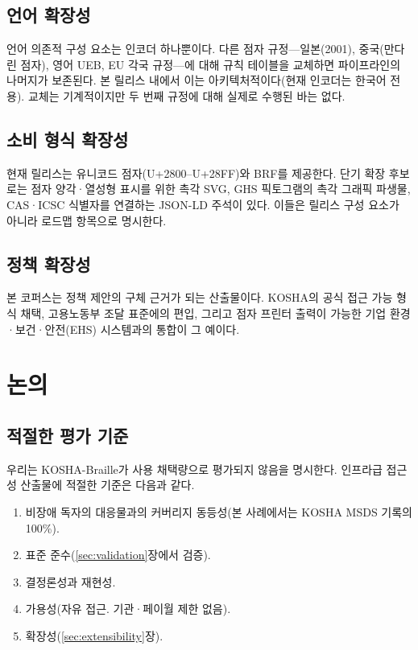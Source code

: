 \documentclass[journal]{IEEEtran}
\begin{document}
\subsection{언어 확장성}

언어 의존적 구성 요소는 인코더 하나뿐이다. 다른 점자 규정---일본(2001), 중국(만다린 점자), 영어 UEB, EU 각국 규정---에 대해 규칙 테이블을 교체하면 파이프라인의 나머지가 보존된다. 본 릴리스 내에서 이는 아키텍처적이다(현재 인코더는 한국어 전용). 교체는 기계적이지만 두 번째 규정에 대해 실제로 수행된 바는 없다.

\subsection{소비 형식 확장성}

현재 릴리스는 유니코드 점자(U+2800--U+28FF)와 BRF를 제공한다. 단기 확장 후보로는 점자 양각·열성형 표시를 위한 촉각 SVG, GHS 픽토그램의 촉각 그래픽 파생물, CAS·ICSC 식별자를 연결하는 JSON-LD 주석이 있다. 이들은 릴리스 구성 요소가 아니라 로드맵 항목으로 명시한다.

\subsection{정책 확장성}

본 코퍼스는 정책 제안의 구체 근거가 되는 산출물이다. KOSHA의 공식 접근 가능 형식 채택, 고용노동부 조달 표준에의 편입, 그리고 점자 프린터 출력이 가능한 기업 환경·보건·안전(EHS) 시스템과의 통합이 그 예이다.

\section{논의}
\label{sec:discussion}

\subsection{적절한 평가 기준}

우리는 KOSHA-Braille가 사용 채택량으로 평가되지 않음을 명시한다. 인프라급 접근성 산출물에 적절한 기준은 다음과 같다.

\begin{enumerate}
\item 비장애 독자의 대응물과의 커버리지 동등성(본 사례에서는 KOSHA MSDS 기록의 100\%).
\item 표준 준수(\ref{sec:validation}장에서 검증).
\item 결정론성과 재현성.
\item 가용성(자유 접근. 기관·페이월 제한 없음).
\item 확장성(\ref{sec:extensibility}장).
\end{enumerate}
\end{document}
